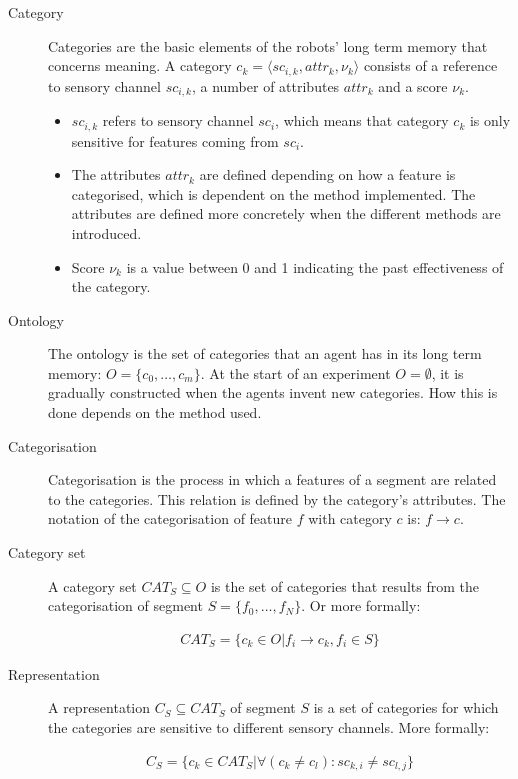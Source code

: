 \begin{description}
\item[Category] Categories are the basic elements of the robots' long term memory that concerns meaning. A category $c_k=\langle sc_{i,k},attr_k,\nu_k\rangle$ consists of a reference to sensory channel $sc_{i,k}$, a number of attributes $attr_k$ and a score $\nu_k$.
\begin{itemize}
\item $sc_{i,k}$ refers to sensory channel $sc_i$, which means that category $c_k$ is only sensitive for features coming from $sc_i$.
\item The attributes $attr_k$ are defined depending on how a feature is categorised, which is dependent on the method implemented. The attributes are defined more concretely when the different methods are introduced.
\item Score $\nu_k$ is a value between 0 and 1 indicating the past effectiveness of the category.
\end{itemize}

\item[Ontology] The ontology is the set of categories that an agent has in its long term memory: $O=\{c_0,\ldots,c_m\}$. At the start of an experiment $O=\emptyset$, it is gradually constructed when the agents invent new categories. How this is done depends on the method used.

\item[Categorisation] Categorisation is the process in which a features of a segment are related to the categories. This relation is defined by the category's attributes. The notation of the categorisation of feature $f$ with category $c$ is: $f \rightarrow c$.

\item[Category set] A category set $CAT_S \subseteq O$ is the set of categories that results from the categorisation of segment $S=\{f_0,\ldots,f_N\}$. Or more formally:

\begin{eqnarray}
CAT_S = \{c_k \in O | f_i \rightarrow c_k, f_i \in S\}
\end{eqnarray}

\item[Representation] A representation $C_S \subseteq CAT_S$ of segment $S$ is a set of categories for which the categories are sensitive to different sensory channels. More formally:

\begin{eqnarray}
C_S = \{c_k \in CAT_S | \forall (c_k \neq c_l): sc_{k,i} \neq sc_{l,j} \}
\end{eqnarray}


\end{description}
